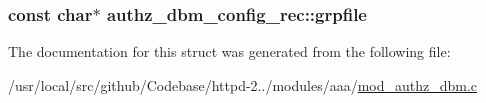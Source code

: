 \subsubsection[{\texorpdfstring{grpfile}{grpfile}}]{\setlength{\rightskip}{0pt plus 5cm}const char$\ast$ authz\+\_\+dbm\+\_\+config\+\_\+rec\+::grpfile}\hypertarget{structauthz__dbm__config__rec_acba7c479b44e2b0bf31e913de4675cfb}{}\label{structauthz__dbm__config__rec_acba7c479b44e2b0bf31e913de4675cfb}


The documentation for this struct was generated from the following file\+:\begin{DoxyCompactItemize}
\item 
/usr/local/src/github/\+Codebase/httpd-\/2../modules/aaa/\hyperlink{mod__authz__dbm_8c}{mod\+\_\+authz\+\_\+dbm.\+c}\end{DoxyCompactItemize}
